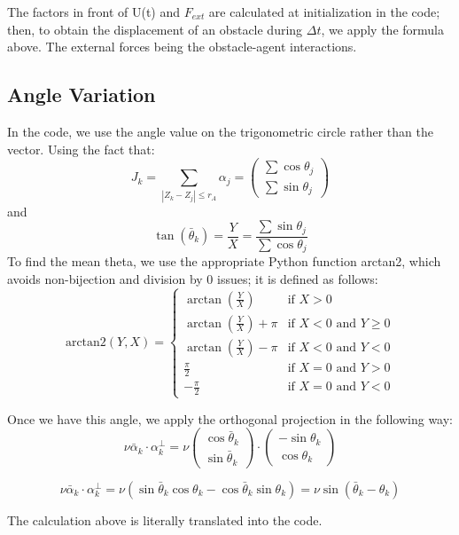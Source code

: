 \documentclass{article}
\begin{document}
The factors in front of U(t) and $F_{ext}$ are calculated at initialization in the code; then, to obtain the displacement of an obstacle during $\Delta t$, we apply the formula above. The external forces being the obstacle-agent interactions.

\subsection{Angle Variation}
In the code, we use the angle value on the trigonometric circle rather than the vector. Using the fact that:
$$J_k = \sum_{|Z_k - Z_j| \le r_A} \alpha_j = \begin{pmatrix} \sum \cos\theta_j \\ \sum \sin\theta_j \end{pmatrix}$$
and
$$\tan(\bar{\theta}_k) = \frac{Y}{X} = \frac{\sum \sin\theta_j}{\sum \cos\theta_j}$$
To find the mean theta, we use the appropriate Python function arctan2, which avoids non-bijection and division by 0 issues; it is defined as follows:
$$\text{arctan2}(Y, X) = \begin{cases} \arctan(\frac{Y}{X}) & \text{if } X > 0 \\ \arctan(\frac{Y}{X}) + \pi & \text{if } X < 0 \text{ and } Y \ge 0 \\ \arctan(\frac{Y}{X}) - \pi & \text{if } X < 0 \text{ and } Y < 0 \\ \frac{\pi}{2} & \text{if } X = 0 \text{ and } Y > 0 \\ -\frac{\pi}{2} & \text{if } X = 0 \text{ and } Y < 0 \end{cases}$$

Once we have this angle, we apply the orthogonal projection in the following way:
$$\nu \bar{\alpha}_k \cdot \alpha_k^\perp = \nu \begin{pmatrix} \cos\bar{\theta}_k \\ \sin\bar{\theta}_k \end{pmatrix} \cdot \begin{pmatrix} -\sin\theta_k \\ \cos\theta_k \end{pmatrix}$$

$$\nu \bar{\alpha}_k \cdot \alpha_k^\perp = \nu (\sin\bar{\theta}_k \cos\theta_k - \cos\bar{\theta}_k \sin\theta_k) = \nu \sin(\bar{\theta}_k - \theta_k)$$

The calculation above is literally translated into the code.
\end{document}
